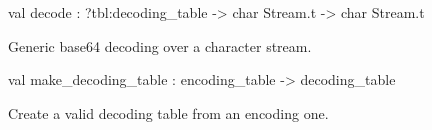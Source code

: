 \documentclass[11pt]{article}
\begin{document}
\label{val:XmlRpcBase64.decode}\begin{ocamldoccode}
val decode : ?tbl:decoding_table -> char Stream.t -> char Stream.t
\end{ocamldoccode}
\begin{ocamldocdescription}
Generic base64 decoding over a character stream.


\end{ocamldocdescription}




\label{val:XmlRpcBase64.make-underscoredecoding-underscoretable}\begin{ocamldoccode}
val make_decoding_table : encoding_table -> decoding_table
\end{ocamldoccode}
\begin{ocamldocdescription}
Create a valid decoding table from an encoding one.


\end{ocamldocdescription}
\end{document}
